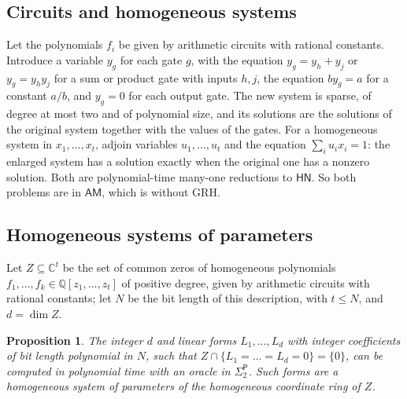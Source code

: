 \documentclass[11pt]{amsart}
\newtheorem{proposition}[thm]{Proposition}
\theoremstyle{definition}
\theoremstyle{remark}
\newcommand{\Q}{\mathbb Q}
\newcommand{\C}{\mathbb C}
\newcommand{\cl}[1]{\mathsf{#1}}
\newcommand{\HN}{\cl{HN}}
\newcommand{\AM}{\cl{AM}}
\newcommand{\Sigtwo}{\Sigma_2^{\cl P}}
\begin{document}
\subsection{Circuits and homogeneous systems}
Let the polynomials $f_i$ be given by arithmetic circuits with rational constants. Introduce a variable $y_g$ for each gate $g$, with the equation $y_g=y_h+y_j$ or $y_g=y_hy_j$ for a sum or product gate with inputs $h,j$, the equation $by_g=a$ for a constant $a/b$, and $y_g=0$ for each output gate. The new system is sparse, of degree at most two and of polynomial size, and its solutions are the solutions of the original system together with the values of the gates. For a homogeneous system in $x_1,\dots,x_t$, adjoin variables $u_1,\dots,u_t$ and the equation $\sum_iu_ix_i=1$: the enlarged system has a solution exactly when the original one has a nonzero solution. Both are polynomial-time many-one reductions to $\HN$. So both problems are in $\AM$, which is \cite[Theorem~2.10]{M17} without GRH.

\subsection{Homogeneous systems of parameters}
Let $Z\subseteq\C^t$ be the set of common zeros of homogeneous polynomials $f_1,\dots,f_k\in\Q[z_1,\dots,z_t]$ of positive degree, given by arithmetic circuits with rational constants; let $N$ be the bit length of this description, with $t\le N$, and $d=\dim Z$.

\begin{proposition}\label{prop:hsop}
The integer $d$ and linear forms $L_1,\dots,L_d$ with integer coefficients of bit length polynomial in $N$, such that $Z\cap\{L_1=\dots=L_d=0\}=\{0\}$, can be computed in polynomial time with an oracle in $\Sigtwo$. Such forms are a homogeneous system of parameters of the homogeneous coordinate ring of $Z$.
\end{proposition}
\end{document}
